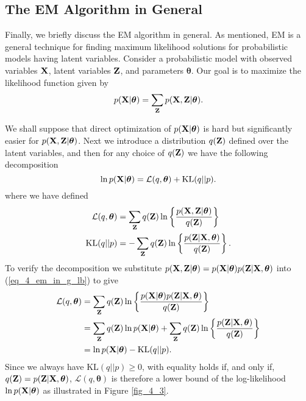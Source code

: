 \documentclass[../book-template.tex]{subfiles}
\begin{document}
\subsection{The EM Algorithm in General}\label{sec_4_EM_in_gen}
Finally, we briefly discuss the EM algorithm in general. As mentioned, EM is a general technique for finding maximum likelihood solutions for probabilistic models having latent variables. Consider a probabilistic model with observed variables ${\bf X}$, latent variables ${\bf Z}$, and parameters $\bm{\theta}$. Our goal is to maximize the likelihood function given by
\begin{equation*}
	p({\bf X}|\bm{\theta}) = \sum_{{\bf Z}} p({\bf X,Z}|\bm{\theta}).
\end{equation*} 
\par We shall suppose that direct optimization of $p({\bf X}|\bm{\theta})$ is hard but significantly easier for $p({\bf X,Z}|\bm{\theta})$. Next we introduce a distribution $q({\bf Z})$ defined over the latent variables, and then for any choice of $q({\bf Z})$ we have the following decomposition
\begin{equation*}
	\ln p({\bf X}|\bm{\theta}) = \mathcal{L}(q,\bm{\theta})+\text{KL}(q||p).
\end{equation*}
where we have defined
\begin{align}
	\label{eq_4_em_in_g_lb} \mathcal{L}(q,\bm{\theta}) &= \sum_{\bf Z}q({\bf Z})\ln \left\{\frac{p({\bf X, Z}|\bm{\theta})}{q({\bf Z})} \right\}\\
	\text{KL}(q||p)&= -\sum_{\bf Z}q({\bf Z})\ln \left\{\frac{p({\bf  Z}|{\bf X}, \bm{\theta})}{q({\bf Z})} \right\}.
\end{align}
To verify the decomposition we substitute $p({\bf X,Z}|\bm{\theta})=p({\bf X}|\bm{\theta})p({\bf Z}|{\bf X},\bm{\theta})$ into (\ref{eq_4_em_in_g_lb}) to give
\begin{align}
	\mathcal{L}(q,\bm{\theta}) &= \sum_{\bf Z}q({\bf Z})\ln \left\{\frac{p({\bf X}|\bm{\theta})p({\bf Z}|{\bf X},\bm{\theta})}{q({\bf Z})} \right\} \notag\\
	&= \sum_{\bf Z}q({\bf Z})\ln p({\bf X}|\bm{\theta}) + \sum_{\bf Z}q({\bf Z})\ln \left\{\frac{p({\bf  Z}|{\bf X}, \bm{\theta})}{q({\bf Z})} \right\}\notag\\
	\label{eq_4_em_in_g_lbdcp} &= \ln p({\bf X}|\bm{\theta}) - \text{KL}(q||p).
\end{align}
Since we always have $\text{KL}(q||p)\geq 0$, with equality holds if, and only if, $q({\bf Z})=p({\bf Z}|{\bf X},\bm{\theta})$, $\mathcal{L}(q,\bm{\theta})$ is therefore a lower bound of the log-likelihood $ \ln p({\bf X}|\bm{\theta})$ as illustrated in Figure \ref{fig_4_3}.
\end{document}
